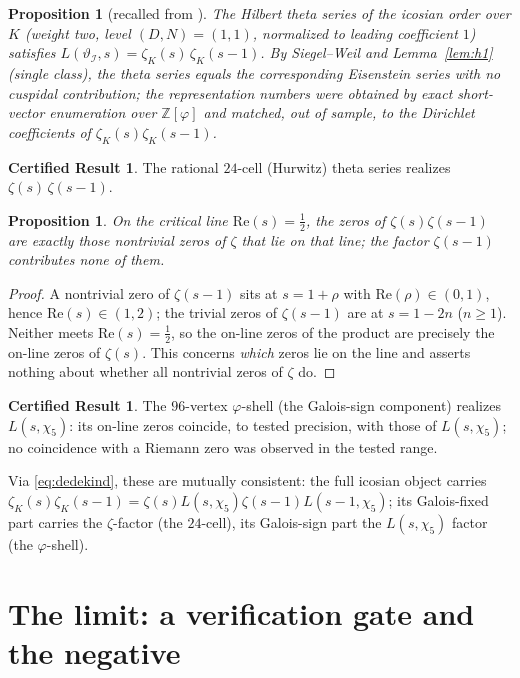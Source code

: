 \documentclass[11pt]{article}
\newtheorem{proposition}[theorem]{Proposition}
\theoremstyle{definition}
\newtheorem{result}[theorem]{Certified Result}
\newcommand{\Z}{\mathbb{Z}}
\newcommand{\zetaK}{\zeta_{K}}
\newcommand{\Icos}{\mathcal{I}}
\renewcommand{\Theta}{\vartheta}
\begin{document}
\begin{proposition}[recalled from \cite{IcosianTriad}]\label{prop:icosian}
The Hilbert theta series of the icosian order over $K$ (weight two, level $(D,N)=(1,1)$,
normalized to leading coefficient $1$) satisfies
$L(\Theta_{\Icos},s)=\zetaK(s)\,\zetaK(s-1)$. By Siegel--Weil and Lemma~\ref{lem:h1}
(single class), the theta series equals the corresponding Eisenstein series with no
cuspidal contribution; the representation numbers were obtained by exact short-vector
enumeration over $\Z[\varphi]$ and matched, out of sample, to the Dirichlet
coefficients of $\zetaK(s)\zetaK(s-1)$.
\end{proposition}

\begin{result}\label{res:24cell}
The rational $24$-cell (Hurwitz) theta series realizes $\zeta(s)\,\zeta(s-1)$.
\end{result}
\begin{proposition}\label{prop:online}
On the critical line $\mathrm{Re}(s)=\tfrac12$, the zeros of $\zeta(s)\zeta(s-1)$ are
exactly those nontrivial zeros of $\zeta$ that lie on that line; the factor
$\zeta(s-1)$ contributes none of them.
\end{proposition}
\begin{proof}
A nontrivial zero of $\zeta(s-1)$ sits at $s=1+\rho$ with $\mathrm{Re}(\rho)\in(0,1)$,
hence $\mathrm{Re}(s)\in(1,2)$; the trivial zeros of $\zeta(s-1)$ are at $s=1-2n$
($n\ge1$). Neither meets $\mathrm{Re}(s)=\tfrac12$, so the on-line zeros of the product
are precisely the on-line zeros of $\zeta(s)$. This concerns \emph{which} zeros lie on
the line and asserts nothing about whether all nontrivial zeros of $\zeta$ do.
\end{proof}

\begin{result}\label{res:twin}
The $96$-vertex $\varphi$-shell (the Galois-sign component) realizes $L(s,\chi_5)$: its
on-line zeros coincide, to tested precision, with those of $L(s,\chi_5)$; no coincidence
with a Riemann zero was observed in the tested range.
\end{result}

Via \eqref{eq:dedekind}, these are mutually consistent: the full icosian object carries
$\zetaK(s)\zetaK(s-1)=\zeta(s)L(s,\chi_5)\zeta(s-1)L(s-1,\chi_5)$; its Galois-fixed part
carries the $\zeta$-factor (the $24$-cell), its Galois-sign part the $L(s,\chi_5)$
factor (the $\varphi$-shell).

\section{The limit: a verification gate and the negative}\label{sec:limit}
\end{document}
